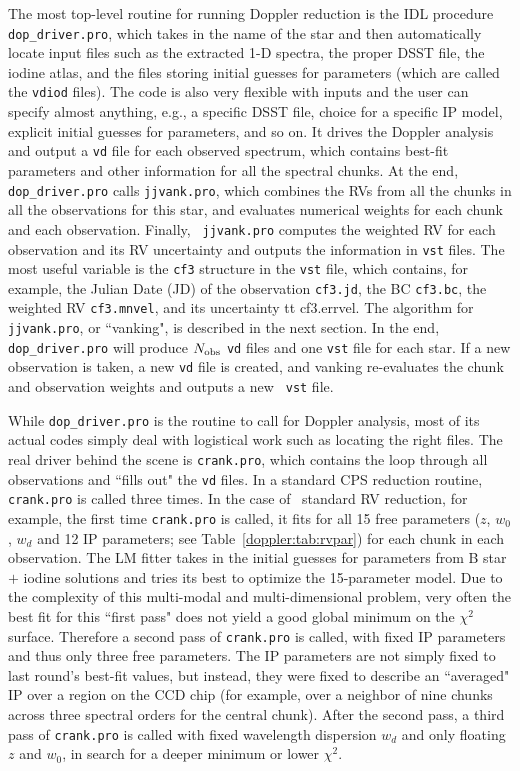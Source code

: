 The most top-level routine for running Doppler reduction is the IDL
procedure {\tt dop\_driver.pro}, which takes in the name of the star
and then automatically locate input files such as the extracted 1-D
spectra, the proper DSST file, the iodine atlas, and the files storing
initial guesses for parameters (which are called the {\tt vdiod}
files). The code is also very flexible with inputs and the user can
specify almost anything, e.g., a specific DSST file, choice for a
specific IP model, explicit initial guesses for parameters, and so
on. It drives the Doppler analysis and output a {\tt vd} file for each
observed spectrum, which contains best-fit parameters and other
information for all the spectral chunks. At the end, {\tt
  dop\_driver.pro} calls {\tt jjvank.pro}, which combines the RVs from
all the chunks in all the observations for this star, and evaluates
numerical weights for each chunk and each observation. Finally, {\tt
  jjvank.pro} computes the weighted RV for each observation and its RV
uncertainty and outputs the information in {\tt vst} files. The most
useful variable is the {\tt cf3} structure in the {\tt vst} file,
which contains, for example, the Julian Date (JD) of the observation
{\tt cf3.jd}, the BC {\tt cf3.bc}, the weighted RV {\tt cf3.mnvel},
and its uncertainty {tt cf3.errvel}. The algorithm for {\tt
  jjvank.pro}, or ``vanking", is described in the next
section. In the end, {\tt dop\_driver.pro} will produce $N_{\rm obs}$
{\tt vd} files and one {\tt vst} file for each star. If a new
observation is taken, a new {\tt vd} file is created, and vanking
re-evaluates the chunk and observation weights and outputs a new {\tt
  vst} file.

While {\tt dop\_driver.pro} is the routine to call for Doppler
analysis, most of its actual codes simply deal with logistical work
such as locating the right files. The real driver behind the scene is
{\tt crank.pro}, which contains the loop through all observations and
``fills out" the {\tt vd} files. In a standard CPS reduction routine,
{\tt crank.pro} is called three times. In the case of \keck\ standard
RV reduction, for example, the first time {\tt crank.pro} is called,
it fits for all 15 free parameters ($z$, $w_0$, $w_d$ and 12 IP
parameters; see Table~\ref{doppler:tab:rvpar}) for each chunk in each
observation. The LM fitter takes in the initial guesses for parameters
from B star $+$ iodine solutions and tries its best to optimize the 15-parameter
model. Due to the complexity of this multi-modal and multi-dimensional
problem, very often the best fit for this ``first pass" does not yield
a good global minimum on the $\chi^2$ surface. Therefore a second
pass of {\tt crank.pro} is called, with fixed IP parameters and thus
only three free parameters. The IP parameters are not simply fixed to last
round's best-fit values, but instead, they were fixed to describe an
``averaged" IP over a region on the CCD chip (for example, over a
neighbor of nine chunks across three spectral orders for the central
chunk). After the second pass, a third pass of {\tt crank.pro} is
called with fixed wavelength dispersion $w_d$ and only floating $z$
and $w_0$, in search for a deeper minimum or lower $\chi^2$.


